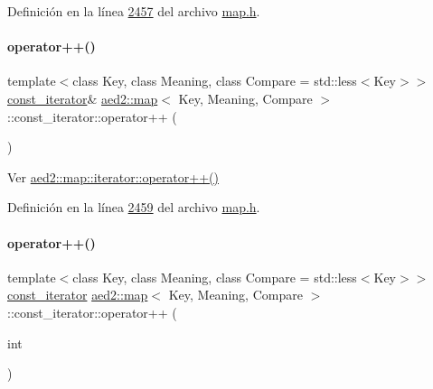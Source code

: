 Definición en la línea \hyperlink{map_8h_source_l02457}{2457} del archivo \hyperlink{map_8h_source}{map.\+h}.

\mbox{\label{classaed2_1_1map_1_1const__iterator_adaada1d489552555135d2ea89c67c271_adaada1d489552555135d2ea89c67c271}} 
\paragraph{\texorpdfstring{operator++()}{operator++()}\hspace{0.1cm}{\footnotesize\ttfamily [1/2]}}
{\footnotesize\ttfamily template$<$class Key, class Meaning, class Compare = std\+::less$<$\+Key$>$$>$ \\
\hyperlink{classaed2_1_1map_1_1const__iterator}{const\+\_\+iterator}\& \hyperlink{classaed2_1_1map}{aed2\+::map}$<$ Key, Meaning, Compare $>$\+::const\+\_\+iterator\+::operator++ (\begin{DoxyParamCaption}{ }\end{DoxyParamCaption})\hspace{0.3cm}{\ttfamily [inline]}}



Ver \hyperlink{classaed2_1_1map_1_1iterator_a7c44de7f0508186e135ddbcfe782fec5_a7c44de7f0508186e135ddbcfe782fec5}{aed2\+::map\+::iterator\+::operator++()} 



Definición en la línea \hyperlink{map_8h_source_l02459}{2459} del archivo \hyperlink{map_8h_source}{map.\+h}.

\mbox{\label{classaed2_1_1map_1_1const__iterator_a2fbc216b2f11694bb567ea850bcfdb2e_a2fbc216b2f11694bb567ea850bcfdb2e}} 
\paragraph{\texorpdfstring{operator++()}{operator++()}\hspace{0.1cm}{\footnotesize\ttfamily [2/2]}}
{\footnotesize\ttfamily template$<$class Key, class Meaning, class Compare = std\+::less$<$\+Key$>$$>$ \\
\hyperlink{classaed2_1_1map_1_1const__iterator}{const\+\_\+iterator} \hyperlink{classaed2_1_1map}{aed2\+::map}$<$ Key, Meaning, Compare $>$\+::const\+\_\+iterator\+::operator++ (\begin{DoxyParamCaption}\item[{int}]{ }\end{DoxyParamCaption})\hspace{0.3cm}{\ttfamily [inline]}}




